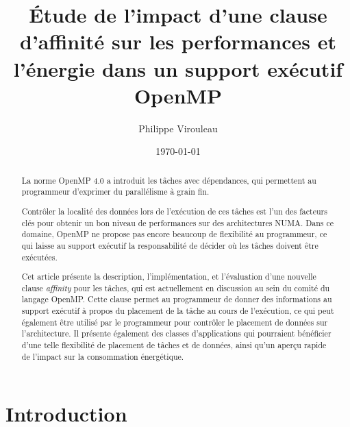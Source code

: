 \documentclass[parallelisme]{compas2017}
\begin{document}
\title{Étude de l'impact d'une clause d'affinité sur les performances et l'énergie
dans un support exécutif OpenMP}

\author{Philippe Virouleau}
\address{Inria,\\
   Univ. Grenoble Alpes,  CNRS, Grenoble Institute of Technology, LIG, Grenoble, France\\
   philippe.virouleau@inria.fr\\
}
\date{\today}



\maketitle

\begin{abstract}
La norme OpenMP 4.0 a introduit les tâches avec dépendances, qui permettent au
programmeur d'exprimer du parallélisme à grain fin.

Contrôler la localité des données lors de l'exécution de ces tâches
est l'un des facteurs clés pour obtenir un bon niveau de performances sur des architectures NUMA.
Dans ce domaine, OpenMP ne propose pas encore beaucoup de flexibilité au programmeur,
ce qui laisse au support exécutif la responsabilité de décider où les tâches doivent
être exécutées.

Cet article présente la description, l'implémentation, et l'évaluation d'une
nouvelle clause \emph{affinity} pour les tâches, qui
est actuellement en discussion au sein du comité du langage OpenMP.
Cette clause permet au programmeur de donner des informations au support exécutif
à propos du placement de la tâche au cours de l'exécution, ce qui peut également
être utilisé par le programmeur pour contrôler le placement de données sur
l'architecture.
Il présente également des classes d'applications qui pourraient bénéficier d'une
telle flexibilité de placement de tâches et de données, ainsi qu'un aperçu rapide
de l'impact sur la consommation énergétique.

\end{abstract}


\section{Introduction}
\end{document}
